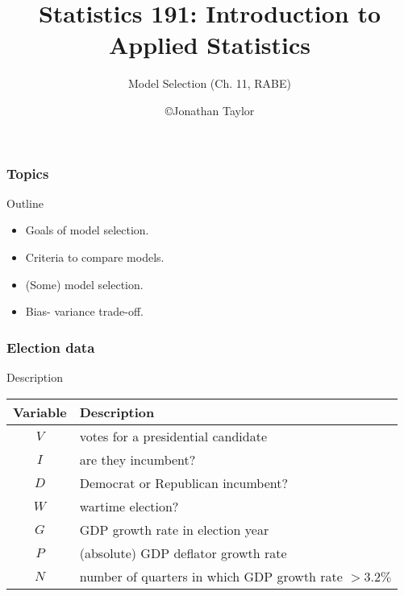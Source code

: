 \documentclass[handout]{beamer}
\title{Statistics 191: Introduction to Applied Statistics}
\subtitle{Model Selection  (Ch. 11, RABE)}
\author{\copyright Jonathan Taylor \\
   }
\begin{document}
   \begin{frame}
   \titlepage
   \end{frame}


   \begin{frame} \frametitle{Topics}

   \begin{block}
   {Outline}
   \begin{itemize}


   \item Goals of model selection.

   \item Criteria to compare models.
   \item (Some) model selection.
   \item Bias- variance trade-off.

   \end{itemize}
   \end{block}
   \end{frame}


   \begin{frame} \frametitle{Election data}

   \begin{block}
   {Description}

   \begin{tabular}{c|l}
   Variable & Description \\ \hline
   $V$ & votes for a presidential candidate \\
   $I$ & are they incumbent? \\
   $D$ & Democrat or Republican incumbent? \\
   $W$ & wartime election? \\
   $G$ & GDP growth rate in election year \\
   $P$ & (absolute) GDP deflator growth rate \\
   $N$ & number of quarters in which GDP growth rate $> 3.2\%$
   \end{tabular}
   \end{block}
   \end{frame}

\end{document}
